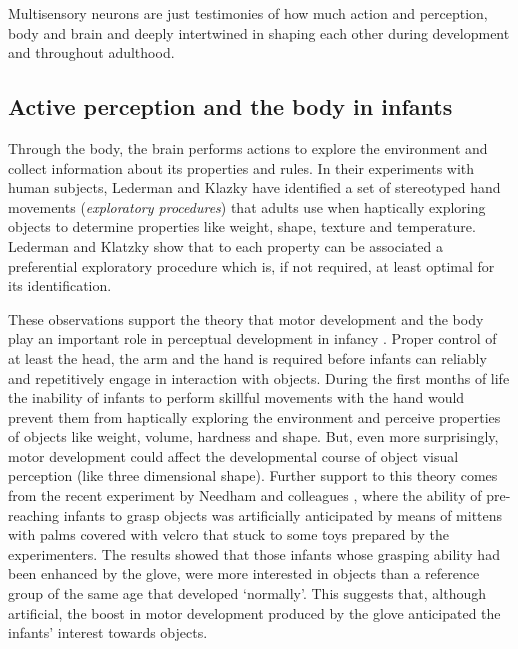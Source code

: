  Multisensory neurons are just testimonies of how much action 
and perception, body and brain and deeply intertwined in shaping each
other during development and throughout adulthood.


\subsection{Active perception and the body in infants}

Through the body, the brain performs actions to explore the environment
and collect information about its properties and rules. In their
experiments with human subjects, Lederman and Klazky
\cite{lederman87hand} have identified a set of stereotyped hand
movements ({\it exploratory procedures}) that adults use when
haptically exploring objects to determine properties like weight,
shape, texture and temperature. Lederman and Klatzky show that to each
property can be associated a preferential exploratory procedure which
is, if not required, at least optimal for its identification.

These observations support the theory that motor development and the
body play an important role in perceptual development in infancy
\cite{bushnell93motor}. Proper control of at least the head, the arm
and the hand is required before infants can reliably and repetitively
engage in interaction with objects. During the first months of life
the inability of infants to perform skillful movements with the hand
would prevent them from haptically exploring the environment and
perceive properties of objects like weight, volume, hardness and
shape. But, even more surprisingly, motor development could affect the
developmental course of object visual perception (like three
dimensional shape).
%
Further support to this theory comes from the recent experiment by
Needham and colleagues \cite{Needham02apick-me-up}, where the ability
of pre-reaching infants to grasp objects was artificially anticipated
by means of mittens with palms covered with velcro that stuck to some
toys prepared by the experimenters. The results showed that those
infants whose grasping ability had been enhanced by the glove, were
more interested in objects than a reference group of the same age that
developed `normally'. This suggests that, although artificial, the
boost in motor development produced by the glove anticipated the
infants' interest towards objects.


